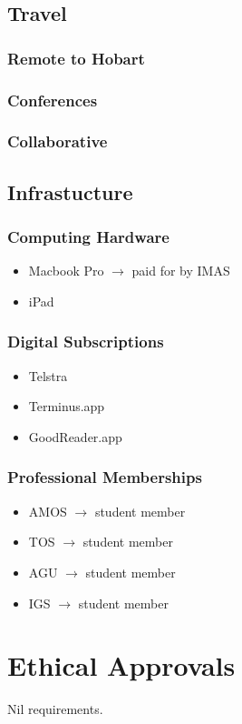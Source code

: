 \documentclass[11pt,a4paper]{article}
\begin{document}
\subsection{Travel}
\subsubsection{Remote to Hobart}
\subsubsection{Conferences}
\subsubsection{Collaborative}
\subsection{Infrastucture}
\subsubsection{Computing Hardware}
\begin{itemize}
\item Macbook Pro $\rightarrow$ paid for by IMAS
\item iPad
\end{itemize}
\subsubsection{Digital Subscriptions}
\begin{itemize}
\item Telstra
\item Terminus.app
\item GoodReader.app
\end{itemize}
\subsubsection{Professional Memberships}
\begin{itemize}
\item AMOS $\rightarrow$ student member
\item TOS $\rightarrow$ student member
\item AGU $\rightarrow$ student member
\item IGS $\rightarrow$ student member
\end{itemize}
\section*{Ethical Approvals}
%
Nil requirements.
\end{document}
